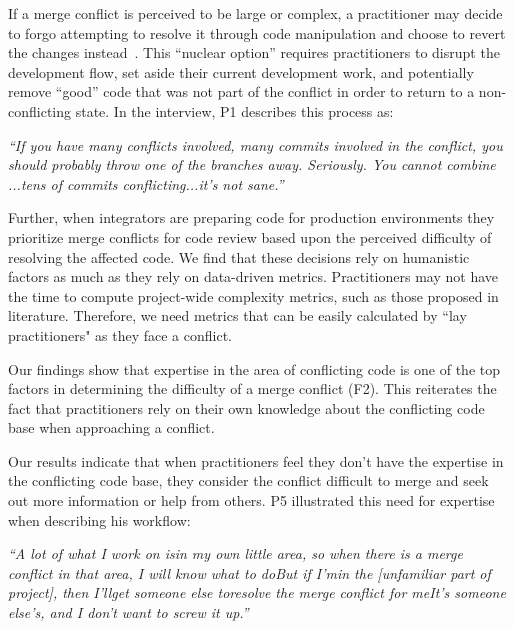 If a merge conflict is perceived to be large or complex, a practitioner may decide to forgo attempting to resolve it through code manipulation and choose to revert the changes instead~\cite{Guzzi2015}.
This ``nuclear option'' requires practitioners to disrupt the development flow, set aside their current development work, and potentially remove ``good'' code that was not part of the conflict in order to return to a non-conflicting state.
In the interview, P1 describes this process as:
\begin{displayquote}
\textit{``If you have many conflicts involved, many commits involved in the conflict, you should probably throw one of the branches away. Seriously. You cannot combine ...tens of commits conflicting...it's not sane.''}
\end{displayquote}

Further, when integrators are preparing code for production environments they prioritize merge conflicts for code review based upon the perceived difficulty of resolving the affected code.
We find that these decisions rely on humanistic factors as much as they rely on data-driven metrics.
Practitioners may not have the time to compute project-wide complexity metrics, such as those proposed in  literature. Therefore, we need metrics that can be easily calculated by ``lay practitioners" as they face a conflict. 

\label{knowledge-based-factors}
Our findings show that expertise in the area of conflicting code is one of the top factors in determining the difficulty of a merge conflict (F2). This reiterates the fact that practitioners rely on their own knowledge about the conflicting code base when approaching a conflict. 

Our results indicate that when practitioners feel they don't have the expertise in the conflicting code base, they consider the conflict difficult to merge and seek out more information or help from others. 
P5 illustrated this need for expertise when describing his workflow: 
\begin{displayquote}
	\textit{``A lot of what I work on is\textellipsis in my own little area, so when there is a merge conflict in that area, I will know what to do\textellipsis But if I'm\textellipsis in the [unfamiliar part of project], then I'll\textellipsis get someone else to\textellipsis resolve the merge conflict for me\textellipsis It's someone else's, and I don't want to screw it up.''}
\end{displayquote}



